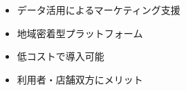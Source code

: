 \begin{itemize}
  \item データ活用によるマーケティング支援
  \item 地域密着型プラットフォーム
  \item 低コストで導入可能
  \item 利用者・店舗双方にメリット
\end{itemize}   